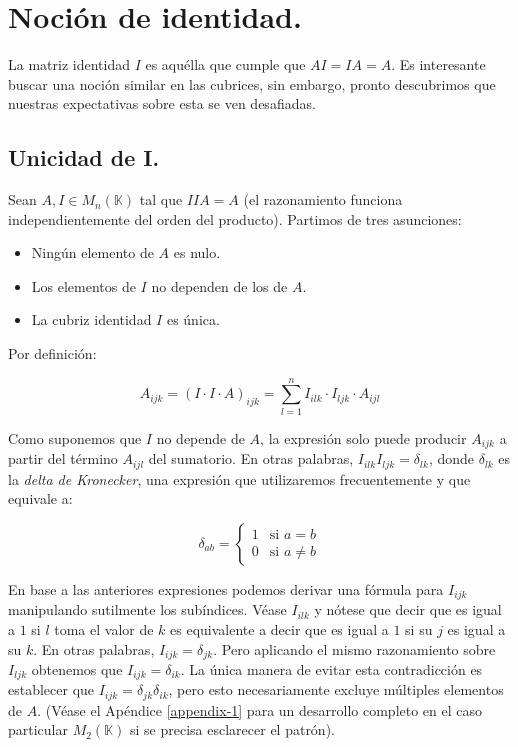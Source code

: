 \section{Noción de identidad.} \label{identity}

La matriz identidad $I$ es aquélla que cumple que $AI = IA = A$. Es interesante buscar una noción similar en las cubrices, sin embargo, pronto descubrimos que nuestras expectativas sobre esta se ven desafiadas.

\subsection{Unicidad de I.} \label{identity-unique}

Sean $A, I \in M_{n} (\mathbb{K})$ tal que $IIA = A$ (el razonamiento funciona independientemente del orden del producto). Partimos de tres asunciones:

\begin{itemize}
	\item Ningún elemento de $A$ es nulo.
	\item Los elementos de $I$ no dependen de los de $A$.
	\item La cubriz identidad $I$ es única.
\end{itemize}

Por definición:

$$A_{ijk} = (I \cdot I \cdot A)_{ijk} = \sum\limits_{l=1}^{n} I_{ilk} \cdot I_{ljk} \cdot A_{ijl}$$

Como suponemos que $I$ no depende de $A$, la expresión solo puede producir $A_{ijk}$ a partir del término $A_{ijl}$ del sumatorio. En otras palabras, $I_{ilk} I_{ljk} = \delta_{lk}$, donde $\delta_{lk}$ es la \textit{delta de Kronecker}, una expresión que utilizaremos frecuentemente y que equivale a:

\begin{equation}
	\delta_{ab} =
	\begin{cases}
		1 & \text{si } a = b \\
		0 & \text{si } a \neq b
	\end{cases}
\end{equation}

En base a las anteriores expresiones podemos derivar una fórmula para $I_{ijk}$ manipulando sutilmente los subíndices. Véase $I_{ilk}$ y nótese que decir que es igual a $1$ si $l$ toma el valor de $k$ es equivalente a decir que es igual a $1$ si su $j$ es igual a su $k$. En otras palabras, $I_{ijk} = \delta_{jk}$. Pero aplicando el mismo razonamiento sobre $I_{ljk}$ obtenemos que $I_{ijk} = \delta_{ik}$. La única manera de evitar esta contradicción es establecer que $I_{ijk} = \delta_{jk} \delta_{ik}$, pero esto necesariamente excluye múltiples elementos de $A$. (Véase el Apéndice \ref{appendix-1} para un desarrollo completo en el caso particular $M_2 (\mathbb{K})$ si se precisa esclarecer el patrón).

